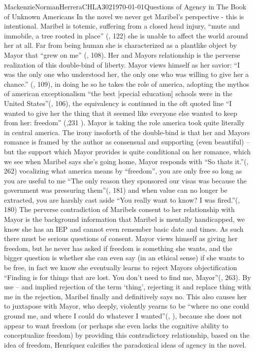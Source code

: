 \documentclass{article}
\begin{document}
\begin{mla}{Mackenzie}{Norman}{Herrera}{CHLA302}{\today}{Questions of Agency in The Book of Unknown Americans}
In the novel we never get Maribel's perspective - this is intentional. Maribel is totemic, suffering from a closed head injury,  ``mute and immobile, a tree rooted in place'' (\cite{Henriquez2014-sh}, 122) she is unable to affect the world around her at all. Far from being human she is characterized as a plantlike object by Mayor that ``grew on me'' (\cite{Henriquez2014-sh}, 108). Her and Mayors relationship is the perverse realization of this double-bind of liberty. Mayor views himself as her savior: ``I was the only one who understood her, the only one who was willing to give her a chance.'' (\cite{Henriquez2014-sh}, 109), in doing he so he takes the role of america, adopting the mythos of american exceptionalism ``the best [special education] schools were in the United States''(\cite{Henriquez2014-sh}, 106), the equivalency is continued in the oft quoted line ``I wanted to give her the thing that it seemed like everyone else wanted to keep from her: freedom'' (\cite{Henriquez2014-sh},231 ). Mayor is taking the role america took quite literally in central america. The irony insoforth of the double-bind is that her and Mayors romance is framed by the author as consensual and supporting (even beautiful) -- but the support which Mayor provides is quite conditional on her romance, which we see when Maribel says she's going home, Mayor responds with ``So thats it.''(\cite{Henriquez2014-sh}, 262) vocalizing what america means by ``freedom'', you are only free so long as you are useful to me ``The only reason they sponsored our visas was because the government was pressuring them''(\cite{Henriquez2014-sh}, 181) and when value can no longer be extracted, you are harshly cast aside ``You really want to know? I was fired.''(\cite{Henriquez2014-sh}, 180) The perverse contradiction of Maribels consent to her relationship with Mayor is the background information that Maribel is mentally handicapped, we know she has an IEP and cannot even remember basic date and times. As such there must be serious questions of consent. Mayor views himself as giving her freedom, but he never has asked if freedom is something she wants, and the bigger question is whether she can even say (in an ethical sense) if she wants to be free, in fact we know she eventually learns to reject Mayors objectification ``Finding is for things that are lost. You don't need to find me, Mayor''(\cite{Henriquez2014-sh}, 263). By use -- and implied rejection of the term `thing', rejecting it and replace thing with me in the rejection, Maribel finally and definitively says no. This also causes her to juxtapose with Mayor, who deeply, violently yearns to be ``where no one could ground me, and where I could do whatever I wanted''(\cite{Henriquez2014-sh}, ), because she does not appear to want freedom (or perhaps she even lacks the cognitive ability to conceptualize freedom) by providing this contradictory relationship, based on the idea of freedom, Henríquez calcifies the paradoxical ideas of agency in the novel.


\end{mla}
\end{document}
